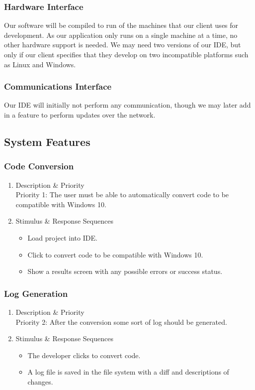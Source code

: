 \documentclass[12pt]{article}
\begin{document}
\subsubsection{Hardware Interface}

Our software will be compiled to run of the machines that our client uses for development. As our application only runs on a single
machine at a time, no other hardware support is needed. We may need two versions of our IDE, but only if our client specifies that
they develop on two incompatible platforms such as Linux and Windows.

\subsubsection{Communications Interface}

Our IDE will initially not perform any communication, though we may later add in a feature to perform updates over the network.

\subsection{System Features}

\subsubsection{Code Conversion}

\begin{enumerate}
    \item Description \& Priority\\
    Priority 1: The user must be able to automatically convert code to be compatible with Windows 10.
    \item Stimulus \& Response Sequences
    \begin{itemize}
        \item Load project into IDE.
        \item Click to convert code to be compatible with Windows 10.
        \item Show a results screen with any possible errors or success status.
    \end{itemize}
\end{enumerate}

\subsubsection{Log Generation}

\begin{enumerate}
    \item Description \& Priority\\
    Priority 2: After the conversion some sort of log should be generated.
    \item Stimulus \& Response Sequences
    \begin{itemize}
        \item The developer clicks to convert code.
        \item A log file is saved in the file system with a diff and descriptions of changes.
    \end{itemize}
\end{enumerate}
\end{document}
